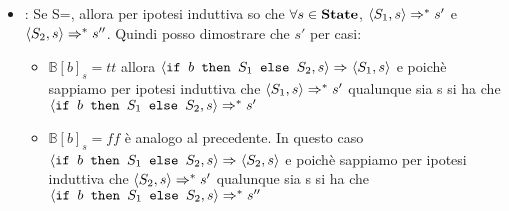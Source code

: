 {\begin{itemize}
	\item {}: Se 
	S=, allora per ipotesi induttiva so che 
	$\forall{}s\in\states$, $\confSs{S_1}{s}\Rar{*}s'$ e 
	$\confSs{S_2}{s}\Rar{*}s''$. Quindi posso dimostrare che 
	\Rar{*}$s'$ per casi:
	\begin{itemize}
	\item $\mathbb{B}[b]_s=tt$ allora 
	$\confSs{\ifABC{b}{S_1}{S_2}}{s}\Rar{}\confSs{{S_1}}{s}$ e poichè sappiamo
	per ipotesi induttiva che $\confSs{S_1}{s}\Rar{*}s'$ qualunque sia s si ha
	che $\confSs{\ifABC{b}{S_1}{S_2}}{s}\Rar{*}s'$

	\item $\mathbb{B}[b]_s=ff$ è analogo al precedente. In questo caso 
	$\confSs{\ifABC{b}{S_1}{S_2}}{s}\Rar{}\confSs{{S_2}}{s}$ e poichè sappiamo
	per ipotesi induttiva che $\confSs{S_2}{s}\Rar{*}s'$ qualunque sia s si ha
	che $\confSs{\ifABC{b}{S_1}{S_2}}{s}\Rar{*}s''$
	\end{itemize}

	\end{itemize}
}
\newpage